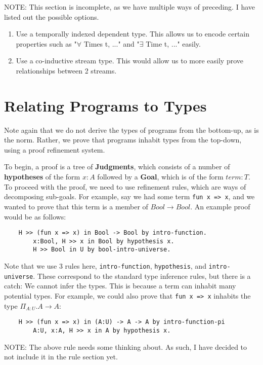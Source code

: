 \documentclass{article}
\begin{document}
{\color{red} NOTE:} This section is incomplete, as we have multiple ways of preceding. I have listed out the possible options.

\begin{enumerate}
    \item Use a temporally indexed dependent type. This allows us to encode
    certain properties such as "$\forall$ Times t, ..." and "$\exists$ Time t, ..." easily.
    \item Use a co-inductive stream type. This would allow us to more easily
    prove relationships between 2 streams.
\end{enumerate}

\section{Relating Programs to Types}
Note again that we do not derive the types of programs from the bottom-up, as is the norm. Rather, we prove that programs inhabit types from the top-down, using a proof refinement system.

To begin, a proof is a tree of \textbf{Judgments}, which consists of a number of \textbf{hypotheses} of the form $x:A$ followed by a \textbf{Goal}, which is of the form $term:T$. To proceed with the proof, we need to use refinement rules, which are ways of decomposing sub-goals. For example, say we had some term \lstinline{fun x => x}, and we wanted to prove that this term is a member of $Bool \rightarrow Bool$. An example proof would be as follows:
\begin{verbatim}
    H >> (fun x => x) in Bool -> Bool by intro-function.
        x:Bool, H >> x in Bool by hypothesis x.
        H >> Bool in U by bool-intro-universe.
\end{verbatim}
Note that we use 3 rules here, \lstinline{intro-function}, \lstinline{hypothesis}, and \lstinline{intro-universe}. These correspond to the standard type inference rules, but there is a catch: We cannot infer the types. This is because a term can inhabit many potential types. For example, we could also prove that \lstinline{fun x => x} inhabits the type $\Pi_{A:U}.A \rightarrow A$:
\begin{verbatim}
    H >> (fun x => x) in (A:U) -> A -> A by intro-function-pi
        A:U, x:A, H >> x in A by hypothesis x.
\end{verbatim}

{\color{red} NOTE:} The above rule needs some thinking about. As such, I have decided to not include it in the rule section yet.
\end{document}
